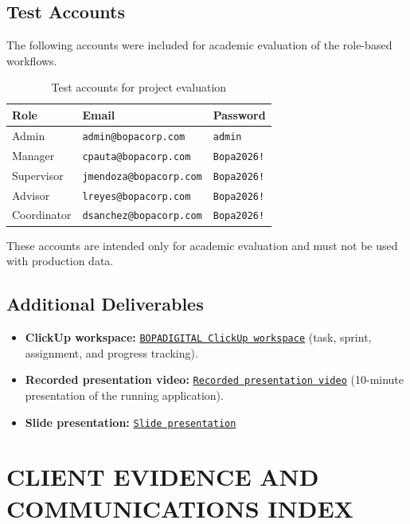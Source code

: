 \documentclass[letterpaper%
, oneside%
, 12pt%
, memoireprojet%
, english%
,creativecommons,hyperref, withAlgo2e %
]{thETS}
\begin{document}
\section{Test Accounts}
The following accounts were included for academic evaluation of the role-based workflows.

\begin{table}[H]
\centering
\small
\begin{tabular}{|p{3.0cm}|p{6.2cm}|p{3.0cm}|}
\hline
\textbf{Role} & \textbf{Email} & \textbf{Password} \\
\hline
Admin & \texttt{admin@bopacorp.com} & \texttt{admin} \\
\hline
Manager & \texttt{cpauta@bopacorp.com} & \texttt{Bopa2026!} \\
\hline
Supervisor & \texttt{jmendoza@bopacorp.com} & \texttt{Bopa2026!} \\
\hline
Advisor & \texttt{lreyes@bopacorp.com} & \texttt{Bopa2026!} \\
\hline
Coordinator & \texttt{dsanchez@bopacorp.com} & \texttt{Bopa2026!} \\
\hline
\end{tabular}
\caption{Test accounts for project evaluation}
\label{tab:appendix_test_accounts}
\end{table}

These accounts are intended only for academic evaluation and must not be used with production data.

\section{Additional Deliverables}
\begin{itemize}
    \item \textbf{ClickUp workspace:} \href{https://sharing.clickup.com/90171310184/l/h/5-90179341245-1/26ab9e034992a64}{\texttt{BOPADIGITAL ClickUp workspace}}
    (task, sprint, assignment, and progress tracking).
    \item \textbf{Recorded presentation video:} \href{https://youtu.be/bKS1ZHdQ9hc}{\texttt{Recorded presentation video}}
    (10-minute presentation of the running application).
    \item \textbf{Slide presentation:} \href{https://canva.link/alyprj19gbzaavg}{\texttt{Slide presentation}}
\end{itemize}

\chapter{CLIENT EVIDENCE AND COMMUNICATIONS INDEX}
\label{chap:client_communications}
\end{document}
